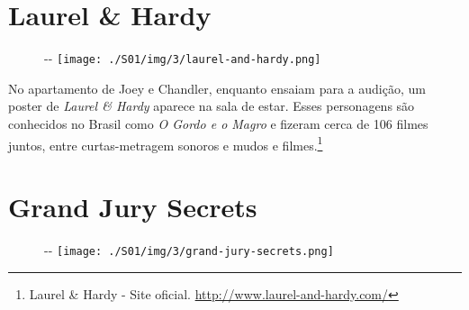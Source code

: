 \hypertarget{laurel-hardy}{%
\section{Laurel \& Hardy}\label{laurel-hardy}}

\begin{figure}[!ht]
  \begin{adjustwidth}{-\oddsidemargin-1in}{-\rightmargin}
    \centering
    \texttt{[image: ./S01/img/3/laurel-and-hardy.png]}
  \end{adjustwidth}
\end{figure}

No apartamento de Joey e Chandler, enquanto ensaiam para a audição, um
poster de \emph{Laurel \& Hardy} aparece na sala de estar. Esses
personagens são conhecidos no Brasil como \emph{O Gordo e o Magro} e
fizeram cerca de 106 filmes juntos, entre curtas-metragem sonoros e
mudos e filmes.\footnote{\sloppy Laurel & Hardy - Site oficial. \url{http://www.laurel-and-hardy.com/}}

\hypertarget{grand-jury-secrets}{%
\section{Grand Jury Secrets}\label{grand-jury-secrets}}

\begin{figure}[!ht]
  \begin{adjustwidth}{-\oddsidemargin-1in}{-\rightmargin}
    \centering
    \texttt{[image: ./S01/img/3/grand-jury-secrets.png]}
  \end{adjustwidth}
\end{figure}

